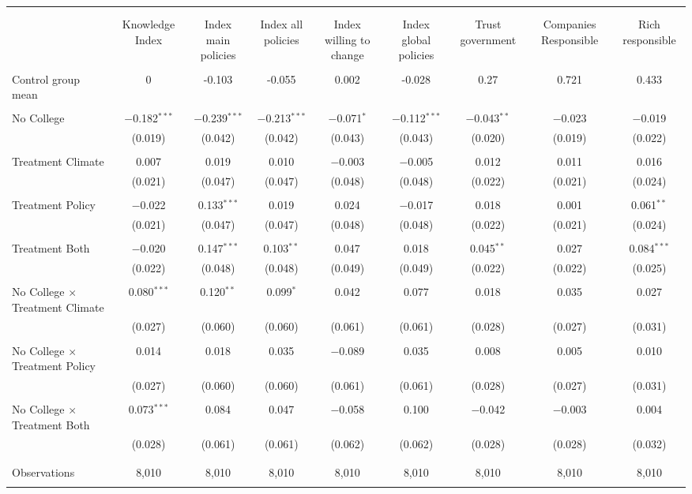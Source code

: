 
\begin{tabular}{@{\extracolsep{5pt}}lcccccccc} 
\\[-1.8ex]\hline 
\hline \\[-1.8ex] 
\\[-1.8ex] & Knowledge Index & Index main policies & Index all policies & Index willing to change & Index global policies & Trust government & Companies Responsible & Rich responsible \\ 
\hline \\[-1.8ex] 
 Control group mean & 0 & -0.103 & -0.055 & 0.002 & -0.028 & 0.27 & 0.721 & 0.433  \\ \hline \\[-1.8ex] No College & $-$0.182$^{***}$ & $-$0.239$^{***}$ & $-$0.213$^{***}$ & $-$0.071$^{*}$ & $-$0.112$^{***}$ & $-$0.043$^{**}$ & $-$0.023 & $-$0.019 \\ 
  & (0.019) & (0.042) & (0.042) & (0.043) & (0.043) & (0.020) & (0.019) & (0.022) \\ 
  & & & & & & & & \\ 
 Treatment Climate & 0.007 & 0.019 & 0.010 & $-$0.003 & $-$0.005 & 0.012 & 0.011 & 0.016 \\ 
  & (0.021) & (0.047) & (0.047) & (0.048) & (0.048) & (0.022) & (0.021) & (0.024) \\ 
  & & & & & & & & \\ 
 Treatment Policy & $-$0.022 & 0.133$^{***}$ & 0.019 & 0.024 & $-$0.017 & 0.018 & 0.001 & 0.061$^{**}$ \\ 
  & (0.021) & (0.047) & (0.047) & (0.048) & (0.048) & (0.022) & (0.021) & (0.024) \\ 
  & & & & & & & & \\ 
 Treatment Both & $-$0.020 & 0.147$^{***}$ & 0.103$^{**}$ & 0.047 & 0.018 & 0.045$^{**}$ & 0.027 & 0.084$^{***}$ \\ 
  & (0.022) & (0.048) & (0.048) & (0.049) & (0.049) & (0.022) & (0.022) & (0.025) \\ 
  & & & & & & & & \\ 
 No College $\times$ Treatment Climate & 0.080$^{***}$ & 0.120$^{**}$ & 0.099$^{*}$ & 0.042 & 0.077 & 0.018 & 0.035 & 0.027 \\ 
  & (0.027) & (0.060) & (0.060) & (0.061) & (0.061) & (0.028) & (0.027) & (0.031) \\ 
  & & & & & & & & \\ 
 No College $\times$ Treatment Policy & 0.014 & 0.018 & 0.035 & $-$0.089 & 0.035 & 0.008 & 0.005 & 0.010 \\ 
  & (0.027) & (0.060) & (0.060) & (0.061) & (0.061) & (0.028) & (0.027) & (0.031) \\ 
  & & & & & & & & \\ 
 No College $\times$ Treatment Both & 0.073$^{***}$ & 0.084 & 0.047 & $-$0.058 & 0.100 & $-$0.042 & $-$0.003 & 0.004 \\ 
  & (0.028) & (0.061) & (0.061) & (0.062) & (0.062) & (0.028) & (0.028) & (0.032) \\ 
  & & & & & & & & \\ 
\hline \\[-1.8ex] 

Observations & 8,010 & 8,010 & 8,010 & 8,010 & 8,010 & 8,010 & 8,010 & 8,010 \\ 
\hline 
\hline \\[-1.8ex] 
\end{tabular} 